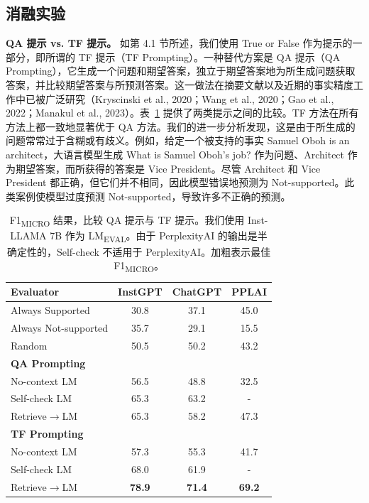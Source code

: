 \documentclass[11pt,UTF8,fontset=fandol]{ctexart}
\newcommand{\eval}{LM\textsubscript{EVAL}}
\begin{document}
\subsection{消融实验}

\textbf{QA 提示 vs. TF 提示。} 如第 4.1 节所述，我们使用 True or False 作为提示的一部分，即所谓的 TF 提示（TF Prompting）。一种替代方案是 QA 提示（QA Prompting），它生成一个问题和期望答案，独立于期望答案地为所生成问题获取答案，并比较期望答案与所预测答案。这一做法在摘要文献以及近期的事实精度工作中已被广泛研究（Kryscinski et al., 2020；Wang et al., 2020；Gao et al., 2022；Manakul et al., 2023）。表~\ref{tab:11} 提供了两类提示之间的比较。TF 方法在所有方法上都一致地显著优于 QA 方法。我们的进一步分析发现，这是由于所生成的问题常常过于含糊或有歧义。例如，给定一个被支持的事实 Samuel Oboh is an architect，大语言模型生成 What is Samuel Oboh's job? 作为问题、Architect 作为期望答案，而所获得的答案是 Vice President。尽管 Architect 和 Vice President 都正确，但它们并不相同，因此模型错误地预测为 Not-supported。此类案例使模型过度预测 Not-supported，导致许多不正确的预测。

\begin{table}[H]\centering
\caption{F1\textsubscript{MICRO} 结果，比较 QA 提示与 TF 提示。我们使用 Inst-LLAMA 7B 作为 \eval。由于 PerplexityAI 的输出是半确定性的，Self-check 不适用于 PerplexityAI。加粗表示最佳 F1\textsubscript{MICRO}。}
\label{tab:11}
\begin{tabular}{lccc}
\toprule
Evaluator & InstGPT & ChatGPT & PPLAI \\
\midrule
Always Supported & 30.8 & 37.1 & 45.0 \\
Always Not-supported & 35.7 & 29.1 & 15.5 \\
Random & 50.5 & 50.2 & 43.2 \\
\midrule
\multicolumn{4}{l}{\textbf{QA Prompting}} \\
No-context LM & 56.5 & 48.8 & 32.5 \\
Self-check LM & 65.3 & 63.2 & - \\
Retrieve$\rightarrow$LM & 65.3 & 58.2 & 47.3 \\
\midrule
\multicolumn{4}{l}{\textbf{TF Prompting}} \\
No-context LM & 57.3 & 55.3 & 41.7 \\
Self-check LM & 68.0 & 61.9 & - \\
Retrieve$\rightarrow$LM & \textbf{78.9} & \textbf{71.4} & \textbf{69.2} \\
\bottomrule
\end{tabular}
\end{table}
\end{document}

